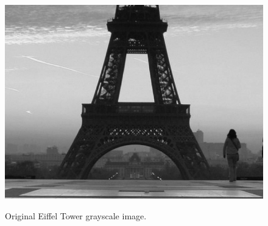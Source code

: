 \begin{figure}[ht!]
\begin{center}
\includegraphics[height=0.4\textwidth]{fig/eiffel_grayscale}\\
\caption{Original Eiffel Tower grayscale image.}
\label{fig_eiffel_grayscale}
\end{center}
\end{figure}
